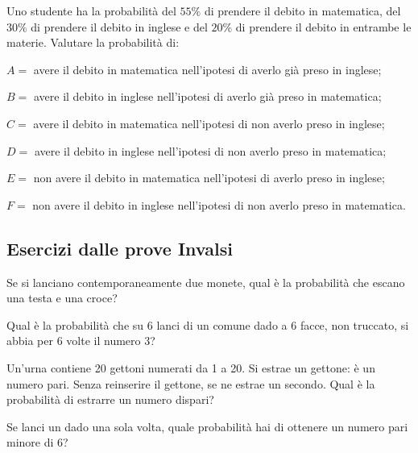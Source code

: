 \begin{esercizio}[\Ast]
 \label{ese:9.64}
Uno studente ha la probabilità del $55\%$ di prendere il debito in matematica, del $30\%$ di prendere il debito in inglese e del $20\%$ di prendere il debito in entrambe le materie. Valutare la probabilità di:
\begin{itemize*}
\item $ A= $ avere il debito in matematica nell'ipotesi di averlo già preso in inglese;
\item $ B= $ avere il debito in inglese nell'ipotesi di averlo già preso in matematica;
\item $ C= $ avere il debito in matematica nell'ipotesi di non averlo preso in inglese;
\item $ D= $ avere il debito in inglese nell'ipotesi di non averlo preso in matematica;
\item $ E= $ non avere il debito in matematica nell'ipotesi di averlo preso in inglese;
\item $ F= $ non avere il debito in inglese nell'ipotesi di non averlo preso in matematica.
\end{itemize*}
\end{esercizio}

\subsection*{Esercizi dalle prove Invalsi}

\begin{esercizio}%
Se si lanciano contemporaneamente due monete, qual è la probabilità che escano una testa e una croce?
\end{esercizio}

\begin{esercizio} %
Qual è la probabilità che su 6 lanci di un comune dado a 6 facce, non truccato, si abbia per 6 volte il numero 3?
\end{esercizio}

\begin{esercizio} %
Un'urna contiene 20 gettoni numerati da 1 a 20. Si estrae un gettone: è un numero pari. Senza reinserire il gettone, se ne estrae un secondo. Qual è la probabilità di estrarre un numero dispari?
\end{esercizio}

\begin{esercizio} %
Se lanci un dado una sola volta, quale probabilità hai di ottenere un numero pari minore di 6?
\end{esercizio}

